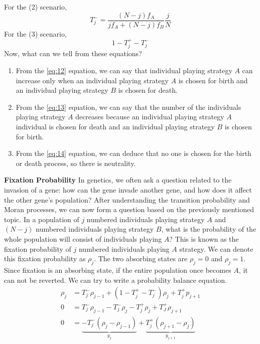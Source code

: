 \documentclass{article}
\begin{document}
For the (2) scenario,
\begin{equation}
T_j^-=\frac{(N-j)f_A}{jf_A+(N-j)f_B}\frac{j}{N} \label{eq:14}
\end{equation}
For the (3) scenario,
\begin{equation}
1-T_j^+-T_j^- \label{eq:15}
\end{equation}
Now, what can we tell from these equations?
\begin{enumerate}
\item From the \eqref{eq:12} equation, we can say that  individual playing strategy $A$ can increase only when an individual playing strategy $A$  is chosen for birth and an individual playing strategy $B$  is chosen for death.
\item From the \eqref{eq:13} equation, we can say that the number of the individuals playing strategy $A$ decreases because an individual playing strategy $A$ individual is chosen for death and an individual playing strategy $B$ is chosen for birth.
\item From the \eqref{eq:14} equation, we can deduce that no one is chosen for the birth or death process, so there is neutrality.
\end{enumerate}
\textbf{Fixation Probability}
\newline
In genetics, we often ask a question related to the invasion of a gene: how can the gene invade another gene, and how does it affect the other gene's population?
After understanding the transition probability and Moran processes, we can now form a question based on the previously mentioned topic.
In a population of $j$ numbered individuals playing strategy $A$ and $(N-j)$ numbered individuals playing strategy $B$, what is the probability of the whole population will consist of individuals playing $A$?
This is known as the fixation probability of $j$ numbered individuals playing $A$ strategy.
We can denote this fixation probability as $\rho_j$.
The two absorbing states are $\rho_j=0$ and $\rho_j=1$.
Since fixation is an absorbing state, if the entire population once becomes $A$, it can not be reverted. We can try to write a probability balance equation.
\begin{align}
\rho_j &= T_j^-\rho_{j-1}+(1-T_j^+ - T_j^-)\rho_j + T_j^+p_{j+1} \nonumber\\
0 &= T_j^-\rho_{j-1} - T_j^-\rho_j - T_j^+\rho_j + T_J^+\rho_{j+1}\nonumber\\
0 &= \underbrace{-T^-_j (\rho_j - \rho_{j-1})}_{y_j} + \underbrace{T^+_j (\rho_{j+1} - \rho_j)}_{y_{j+1}} \label{eq:16}
\end{align}
\end{document}

